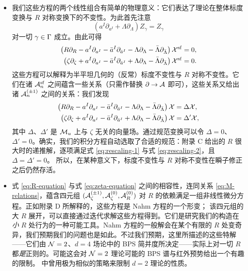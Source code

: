 \begin{itemize}
\item
我们这些方程的两个线性组合有简单的物理意义：它们表达了理论在整体标度变换与 $R$ 对称变换下的不变性。为此首先注意
\begin{equation}
\left(a^I \partial_{a^I} + \Lambda \partial_\Lambda\right) Z_\gamma = Z_\gamma
\end{equation}
对一切 $\gamma \in \Gamma$ 成立。由此可得
\begin{align}
\left(R \partial_R - a^I \partial_{a^I} - \bar{a}^I \partial_{\bar{a}^I} - \Lambda \partial_\Lambda - \bar{\Lambda} \partial_{\bar{\Lambda}} \right) \mathcal{X}^{\mathrm{sf}} &= 0, \\
\left(\zeta \partial_\zeta  + a^I \partial_{a^I} - \bar{a}^I \partial_{\bar{a}^I} + \Lambda \partial_\Lambda - \bar{\Lambda} \partial_{\bar{\Lambda}} \right) \mathcal{X}^{\mathrm{sf}} &= 0.
\end{align}
这些方程可以解释为半平坦几何的（反常）标度不变性与 $R$ 对称不变性。它们在诸 $\mathcal{A}^{\mathrm{sf}}_n$ 之间蕴含一些关系（只需作替换 $\partial \to \mathcal{A}$ 即可），这些关系又给出诸 $\mathcal{A}_n^{(\pm 1)}$ 之间的关系：我们发现
\begin{align}
\left(R \partial_R - a^I \partial_{a^I} - \bar{a}^I \partial_{\bar{a}^I} - \Lambda \partial_\Lambda - \bar{\Lambda} \partial_{\bar{\Lambda}} \right) \mathcal{X} &= \Delta \mathcal{X}, \label{eq:rescaling-1} \\
\left(\zeta \partial_\zeta  + a^I \partial_{a^I} - \bar{a}^I \partial_{\bar{a}^I} + \Lambda \partial_\Lambda - \bar{\Lambda} \partial_{\bar{\Lambda}} \right) \mathcal{X} &= \Delta' \mathcal{X}, \label{eq:rescaling-2}
\end{align}
其中 $\Delta$、$\Delta'$ 是 $\mathcal{M}_u$ 上与 $\zeta$ 无关的向量场。通过规范变换可以令 $\Delta = 0$、$\Delta' = 0$。确实，我们的积分方程自动选取了合适的规范：附录 C 给出的 $R$ 很大时的递推解，逐项满足式 \eqref{eq:rescaling-1} 与式 \eqref{eq:rescaling-2}，且 $\Delta = \Delta' = 0$。%
所以，在某种意义下，标度不变性与 $R$ 对称不变性在瞬子修正之后仍然存活。

\item
式 \eqref{eq:R-equation} 与式 \eqref{eq:zeta-equation} 之间的相容性，连同关系 \eqref{eq:M-relations}，蕴含四元组 $(\mathcal{A}_\zeta^{(\pm 1)}, \mathcal{A}_\zeta^{(0)}, \mathcal{A}_R^{(0)})$ 对 $R$ 的依赖满足一组非线性微分方程。正如附录 D 所解释的，这些方程是 Nahm 方程的一个形变；%
该四元组的大 $R$ 展开，可以直接通过迭代求解这些方程得到。它们是研究我们的构造在\emph{小} $R$ 处行为的一种可能工具。Nahm 方程的一般解会在某个有限的 $R$ 处变奇异，我们预期我们的问题也是如此。不过我们预期，这里所描述的这些特解——它们由 $\mathcal{N}=2$、$d=4$ 场论中的 BPS 简并度所决定——实际上对一切 $R$ 都\emph{是}正则的。可能这会对 $\mathcal{N}=2$ 理论可能的 BPS 谱与红外预势给出一个有趣的限制。\cite{Cecotti:1993rm} 中曾用极为相似的策略来限制 $d=2$ 理论的性质。


\end{itemize}
